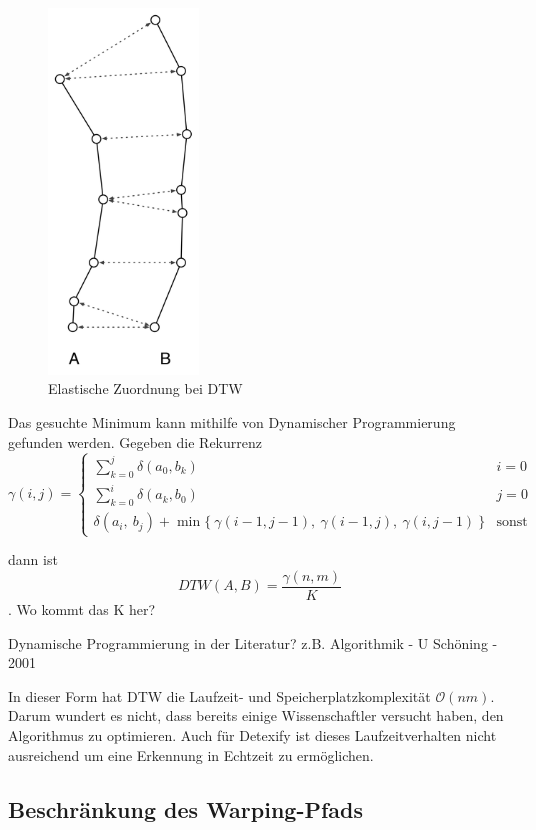 \begin{figure}
  \centering \includegraphics[width=4cm]{figures/dtw.png}
  \caption{Elastische Zuordnung bei DTW}
  \label{fig:dtw}
\end{figure}

Das gesuchte Minimum kann mithilfe von Dynamischer Programmierung gefunden werden. Gegeben die Rekurrenz
\begin{equation}
  \label{eqn:dp}
  \gamma(i,j) =
  \begin{cases}
    \sum_{k=0}^j \delta(a_0, b_k) & i = 0 \\
    \sum_{k=0}^i \delta(a_k, b_0) & j = 0 \\
    \delta(a_i,~b_j) + \min\{~\gamma(i-1,j-1),~\gamma(i-1,j),~\gamma(i,j-1)~\} & \text{sonst}
  \end{cases}  
\end{equation}

dann ist
\begin{equation}
  \label{eqn:dpdtw}
  DTW(A,B) = \frac{\gamma(n,m)}{K}
\end{equation}. \TODO Wo kommt das K her?

\TODO Dynamische Programmierung in der Literatur? z.B. Algorithmik - U Schöning - 2001

In dieser Form hat DTW die Laufzeit- und Speicherplatzkomplexität \(\mathcal{O}(nm)\). Darum wundert es nicht, dass bereits einige Wissenschaftler versucht haben, den Algorithmus zu optimieren. Auch für Detexify ist dieses Laufzeitverhalten nicht ausreichend um eine Erkennung in Echtzeit zu ermöglichen.


\subsection{Beschränkung des Warping-Pfads} %
\label{sub:constrained_warping_window}

